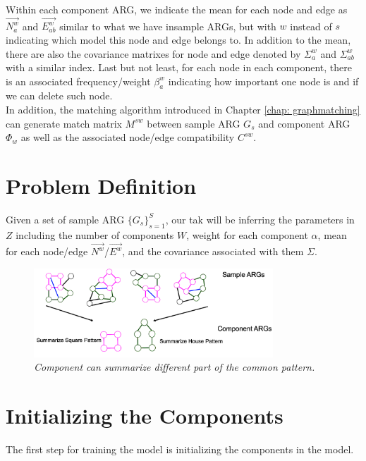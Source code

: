 Within each component ARG, we indicate the mean for each node and edge as $\overrightarrow{N^w_a}$ and $\overrightarrow{E^w_{ab}}$ similar to what we have insample ARGs, but with $w$ instead of $s$ indicating which model this node and edge belongs to. In addition to the mean, there are also the covariance matrixes for node and edge denoted by $\Sigma^w_a$ and $\Sigma^w_{ab}$ with a similar index. Last but not least, for each node in each component, there is an associated frequency/weight $\beta^w_a$ indicating how important one node is and if we can delete such node.\\

In addition, the matching algorithm introduced in Chapter \ref{chap: graphmatching} can generate match matrix $M^{sw}$ between sample ARG $G_s$ and component ARG $\Phi_w$ as well as the associated node/edge compatibility $C^{sw}$.

\section{Problem Definition}

Given a set of sample ARG $\{G_s\}_{s=1}^S$, our tak will be inferring the parameters in $Z$ including the number of components $W$, weight for each component $\alpha$, mean for each node/edge $\overrightarrow{N^w}$/$\overrightarrow{E^w}$, and the covariance associated with them $\Sigma$.\\

\begin{figure}[h]
	\centering
	\captionsetup{justification=centering}
	\includegraphics[width=0.8\textwidth]{figs/component_summary.png}
	\caption[Caption for LOF]{\emph{Component can summarize different part of the common pattern.}}
	\label{fig:component_summary}
\end{figure}

\section{Initializing the Components}

The first step for training the model is initializing the components in the model.\\

